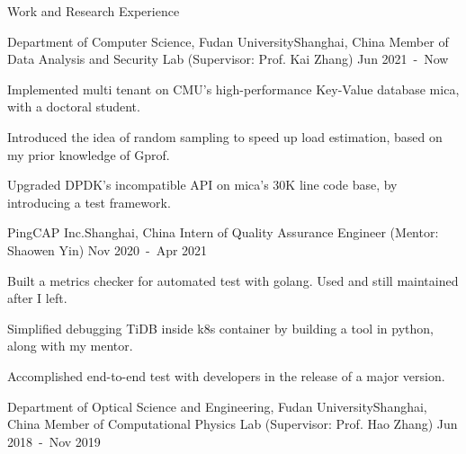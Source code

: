 \documentclass{resume} %
\begin{document}
\begin{rSection}{Work and Research Experience}



\begin{rSubsection}
{Department of Computer Science, Fudan University}{Shanghai, China}
{Member of Data Analysis and Security Lab (Supervisor: Prof. Kai Zhang)} {Jun 2021\ -\ Now}

\item Implemented multi tenant on CMU's high-performance Key-Value database mica, with a doctoral student.
\item Introduced the idea of random sampling to speed up load estimation, based on my prior knowledge of Gprof.
\item Upgraded DPDK's incompatible API on mica's 30K line code base, by introducing a test framework.

\end{rSubsection}


\begin{rSubsection}
{PingCAP Inc.}{Shanghai, China}
{Intern of Quality Assurance Engineer (Mentor: Shaowen Yin)} {Nov 2020\ -\ Apr 2021}

\item Built a metrics checker for automated test with golang. Used and still maintained after I left.

\item Simplified debugging TiDB inside k8s container by building a tool in python, along with my mentor.

\item Accomplished end-to-end test with developers in the release of a major version.


\end{rSubsection}



\begin{rSubsection}
{Department of Optical Science and Engineering, Fudan University}{Shanghai, China}
{Member of Computational Physics Lab (Supervisor: Prof. Hao Zhang)}
{Jun 2018\ -\ Nov 2019}


\end{rSubsection}
\end{rSection}
\end{document}
